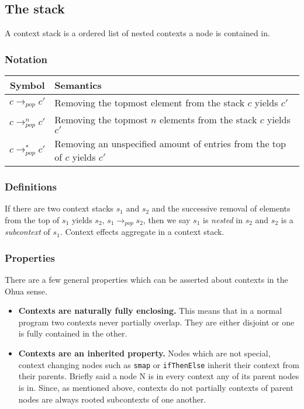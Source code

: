 \subsection{The stack}

A context stack is a ordered list of nested contexts a node is contained in.

\subsubsection{Notation}

\begin{tabular}{c | l}
  Symbol & Semantics \\ \hline
  $c \rightarrow_{pop} c'$ & Removing the topmost element from the stack $c$ yields $c'$ \\
  $c \rightarrow_{pop}^n c'$ & Removing the topmost $n$ elements from the stack $c$ yields $c'$ \\
  $c \rightarrow_{pop}^* c'$ & Removing an unspecified amount of entries from the top of $c$ yields $c'$ \\
\end{tabular}

\subsubsection{Definitions}

If there are two context stacks $s_1$ and $s_2$ and the successive removal of elements from the top of $s_1$ yields $s_2$, $s_1 \rightarrow_{pop} s_2$, then we say $s_1$ is \textit{nested} in $s_2$ and $s_2$ is a \textit{subcontext} of $s_1$.
Context effects aggregate in a context stack.



\subsubsection{Properties}

There are a few general properties which can be asserted about contexts in the Ohua sense.

\begin{itemize}
  \item \textbf{Contexts are naturally fully enclosing.}
        This means that in a normal program two contexts never partially overlap.
        They are either disjoint or one is fully contained in the other.
  \item \textbf{Contexts are an inherited property.}
        Nodes which are not special, context changing nodes such as \texttt{smap} or \texttt{ifThenElse} inherit their context from their parents.
        Briefly said a node N is in every context any of its parent nodes is in.
        Since, as mentioned above, contexts do not partially contexts of parent nodes are always rooted subcontexts of one another.
\end{itemize}

